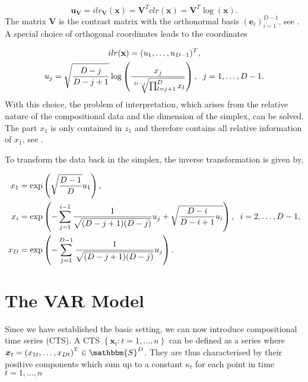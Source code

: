 \begin{equation}
\textbf{u}_{\textbf{V}} = ilr_{\textbf{V}}(\textbf{x}) = \textbf{V}^T clr(\textbf{x}) = \textbf{V}^T \log(\textbf{x}). 
\label{eq:ilr coordinates with V}
\end{equation}
%
The matrix $\textbf{V}$ is the contrast matrix with the orthonormal basis $(\textbf{e}_i)_{i=1}^{D-1}$, see \textcite{Egozcue:2003}. A special choice of orthogonal coordinates leads to the coordinates 

\begin{equation}
\begin{gathered}
ilr(\textbf{x}) = (u_1,\ldots,u_{D-1})^T, \\
u_j = \sqrt{\frac{D-j}{D-j+1}}\log\left(\frac{x_j}{\sqrt[D-j]{\prod_{l=j+1}^D x_l}}\right), \hspace{0.2cm} j=1,\ldots, D-1.
\label{eq:pivot coordinates}
\end{gathered}
\end{equation}
%
With this choice, the problem of interpretation, which arises from the relative nature of the compositional data and the dimension of the simplex, can be solved. The part $x_1$ is only contained in $z_1$ and therefore contains all relative information of $x_1$, see \textcite{Filzmoser:2020}. 

To transform the data back in the simplex, the inverse transformation is given by, 

\begin{align}
x_1 &= \exp\left(\sqrt{\frac{D-1}{D}}u_1\right), \\
x_i &= \exp\left(- \sum_{j=1}^{i-1}\frac{1}{\sqrt{(D-j+1)(D-j)}}u_j + \sqrt{\frac{D-i}{D-i+1}u_i} \right), \hspace{0.2cm} i=2,\ldots, D-1, \\
x_D &= \exp\left(- \sum_{j=1}^{D-1} \frac{1}{\sqrt{(D-j+1)(D-j)}}u_j \right).
\label{eq: Inverse Transformation}
\end{align}

\section{The VAR Model}
\label{sec:The VAR Model}

Since we have established the basic setting, we can now introduce compositional time series (CTS). A CTS $\left\{\bm{x}_t:t=1,\ldots,n \right\}$ can be defined as a series where $\bm{x}_t = \left(x_{1t},\ldots,x_{Dt}\right)^T \in \mathbbm{S}^D$. They are thus characterised by their positive components which sum up to a constant $\kappa_t$ for each point in time $t=1,\ldots,n$ 

